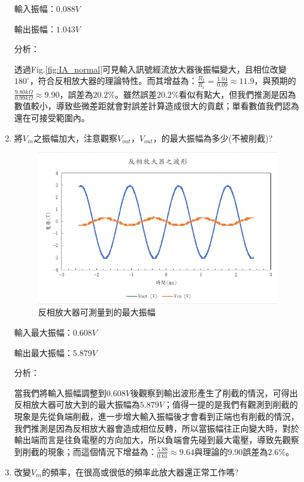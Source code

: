 \documentclass[12pt,a4paper]{article}
\begin{document}
\begin{CJK}{UTF8}{bkai}
\begin{enumerate}
輸入振幅：$0.088V$

輸出振幅：$1.043V$

\noindent 分析：

透過Fig.\ref{fig:IA_normal}可見輸入訊號經流放大器後振幅變大，且相位改變$180^\circ$，符合反相放大器的理論特性。而其增益為：$\frac{R_2}{R_1}=\frac{1.04}{0.09} \approx 11.9$，與預期的$\frac{9.80k\Omega}{0.99k\Omega}\approx9.90$，誤差為$20.2\%$。雖然誤差$20.2\%$看似有點大，但我們推測是因為數值較小，導致些微差距就會對誤差計算造成很大的貢獻；單看數值我們認為還在可接受範圍內。

    \clearpage
    
    \item 將$V_{in}$之振幅加大，注意觀察$V_{out}$，$V_{out}$，的最大振幅為多少(不被削截)?

\begin{figure}[h]
    \centering
    \includegraphics[width=0.7\linewidth]{figures/ia/Maximum output swing of an inverting amplifier.png}
    \caption{反相放大器可測量到的最大振幅}
    \label{fig:IA_Max}
\end{figure}

輸入最大振幅：$0.608V$

輸出最大振幅：$5.879V$

\noindent 分析：

當我們將輸入振幅調整到$0.608V$後觀察到輸出波形產生了削截的情況，可得出反相放大器可放大到的最大振幅為$5.879V$；值得一提的是我們有觀測到削截的現象是先從負端削截，進一步增大輸入振幅後才會看到正端也有削截的情況，我們推測是因為反相放大器會造成相位反轉，所以當振幅往正向變大時，對於輸出端而言是往負電壓的方向加大，所以負端會先碰到最大電壓，導致先觀察到削截的現象；而這個情況下增益為：$\frac{5.88}{0.61}\approx9.64$與理論的$9.90$誤差為$2.6\%$。
    
    \item 改變$V_{in}$的頻率，在很高或很低的頻率此放大器還正常工作嗎?


\end{enumerate}
\end{CJK}
\end{document}

